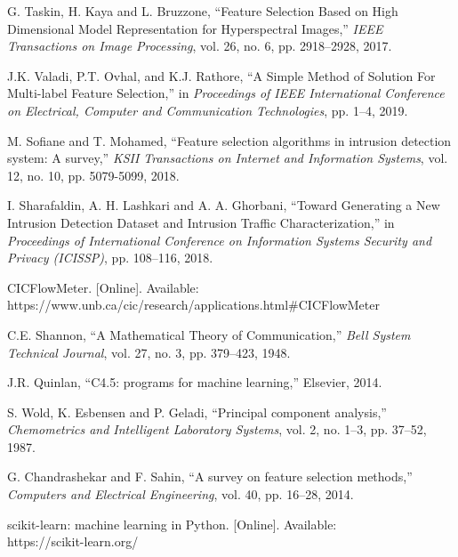 \documentclass{ieeeaccess}
\theoremstyle{definition}
\begin{document}
\begin{thebibliography}{00}
    G. Taskin, H. Kaya and L. Bruzzone, ``Feature Selection Based on High Dimensional Model Representation for Hyperspectral Images,'' \emph{IEEE Transactions on Image Processing}, vol. 26, no. 6, pp. 2918--2928, 2017.

    J.K. Valadi, P.T. Ovhal, and K.J. Rathore, ``A Simple Method of Solution For Multi-label Feature Selection,'' in \emph{Proceedings of IEEE International Conference on Electrical, Computer and Communication Technologies}, pp. 1--4, 2019.

    M. Sofiane and T. Mohamed, ``Feature selection algorithms in intrusion detection system: A survey,'' \emph{KSII Transactions on Internet and Information Systems}, vol. 12, no. 10, pp. 5079-5099, 2018.

    I. Sharafaldin, A. H. Lashkari and A. A. Ghorbani, ``Toward Generating a New Intrusion Detection Dataset and Intrusion Traffic Characterization,'' in \emph{Proceedings of International Conference on Information Systems Security and Privacy (ICISSP)}, pp. 108--116, 2018.

    CICFlowMeter. [Online]. Available: \\ https://www.unb.ca/cic/research/applications.html\#CICFlowMeter

    C.E. Shannon, ``A Mathematical Theory of Communication,'' \emph{Bell System Technical Journal}, vol. 27, no. 3, pp. 379--423, 1948.

    J.R. Quinlan, ``C4.5: programs for machine learning,'' Elsevier, 2014.

    S. Wold, K. Esbensen and P. Geladi, ``Principal component analysis,'' \emph{Chemometrics and Intelligent Laboratory Systems}, vol. 2, no. 1--3, pp. 37--52, 1987.

    G. Chandrashekar and F. Sahin, ``A survey on feature selection methods,'' \emph{Computers and Electrical Engineering}, vol. 40, pp. 16--28, 2014.

    scikit-learn: machine learning in Python. [Online]. Available: \\ https://scikit-learn.org/

\end{thebibliography}
\end{document}
